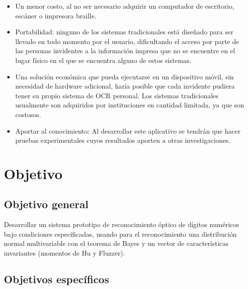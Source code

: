 \documentclass[a4paper, 11pt, oneside]{report}
\begin{document}
	\begin{itemize} 

	\item Un menor costo, al no ser necesario adquirir un computador de escritorio, escáner o impresora braille.

	\item Portabilidad: ninguno de los sistemas tradicionales está diseñado para ser llevado en todo momento por el usuario, dificultando el acceso por parte de las personas invidentes a la información impresa que no se encuentre en el lugar físico en el que se encuentra alguno de estos sistemas.
	
	\item Una solución económica que pueda ejecutarse en un dispositivo móvil, sin necesidad de hardware adicional, haría posible que cada invidente pudiera tener su propio sistema de OCR personal. Los sistemas tradicionales usualmente son adquiridos por instituciones en cantidad limitada, ya que son costosos.

	\item Aportar al conocimiento: Al desarrollar este aplicativo se tendrán que hacer pruebas experimentales cuyos resultados aporten a otras investigaciones.

	\end{itemize}
	
\section{Objetivo}
\label{sect:objective}
	
\subsection{Objetivo general}

Desarrollar un sistema prototipo de reconocimiento óptico de dígitos numéricos bajo condiciones especificadas, usando para el reconocimiento una distribución normal multivariable con el teorema de Bayes y un vector de características invariantes (momentos de Hu y Fluzzer).

\subsection{Objetivos específicos}
	
\end{document}
